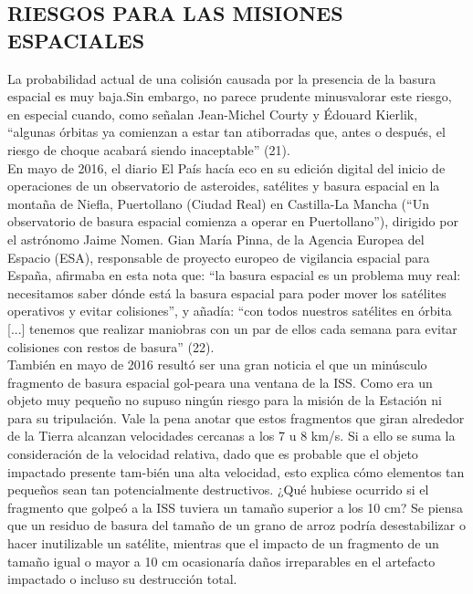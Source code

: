 \documentclass[12pt,letterpaper]{article}
\begin{document}
\pagestyle{fancy}
        \fancyhf{}
        \rhead{}
        \begin{multicols}{2}
\section*{\noindent \small {RIESGOS PARA LAS MISIONES ESPACIALES}}

\noindent La probabilidad actual de una colisión causada por la presencia  de  la  basura  espacial  es  muy  baja.Sin  embargo, no parece prudente minusvalorar este riesgo, en especial  cuando,  como  señalan  Jean-Michel  Courty  y  Édouard Kierlik, “algunas órbitas ya comienzan a estar tan atiborradas que, antes o después, el riesgo de choque acabará siendo inaceptable” (21).
\\

\noindent En mayo de 2016, el diario El País hacía eco en su edición digital del inicio de operaciones de un observatorio de asteroides, satélites y basura espacial en la montaña de Niefla, Puertollano (Ciudad Real) en Castilla-La Mancha (“Un observatorio de basura espacial comienza a operar en Puertollano”), dirigido por el astrónomo Jaime Nomen. Gian María Pinna, de la Agencia Europea del Espacio (ESA), responsable de proyecto europeo de vigilancia espacial  para  España,  afirmaba  en  esta  nota  que:  “la  basura espacial es un problema muy real: necesitamos saber dónde está la basura espacial para poder mover los  satélites  operativos  y  evitar  colisiones”,  y  añadía:  “con todos nuestros satélites en órbita [...] tenemos que realizar maniobras con un par de ellos cada semana para evitar colisiones con restos de basura” (22).
\\

\noindent También en mayo de 2016 resultó ser una gran noticia el que un minúsculo fragmento de basura espacial gol-peara una ventana de la ISS. Como era un objeto muy pequeño  no  supuso  ningún  riesgo  para  la  misión  de  la Estación ni para su tripulación. Vale la pena anotar que estos fragmentos que giran alrededor de la Tierra alcanzan velocidades cercanas a los 7 u 8 km/s. Si a ello se suma la consideración de la velocidad relativa, dado que es probable que el objeto impactado presente tam-bién una alta velocidad, esto explica cómo elementos tan pequeños sean tan potencialmente destructivos. ¿Qué hubiese  ocurrido  si  el  fragmento  que  golpeó  a  la  ISS  tuviera un tamaño superior a los 10 cm? Se piensa que un residuo de basura del tamaño de un grano de arroz podría  desestabilizar  o  hacer  inutilizable  un  satélite,  mientras que el impacto de un fragmento de un tamaño igual o mayor a 10 cm ocasionaría daños irreparables en el artefacto impactado o incluso su destrucción total.
\\


\end{multicols}
\end{document}
